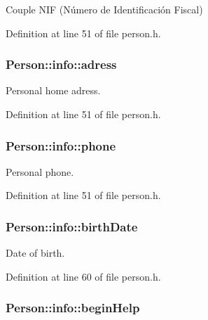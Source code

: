 Couple N\+I\+F (Número de Identificación Fiscal) 



Definition at line 51 of file person.\+h.

\hypertarget{struct_person_1_1info_a350817c964e878c2c59019eb51e9f608}{
\subsubsection[{adress}]{\setlength{\rightskip}{0pt plus 5cm}Person\+::info\+::adress}}\label{struct_person_1_1info_a350817c964e878c2c59019eb51e9f608}


Personal home adress. 



Definition at line 51 of file person.\+h.

\hypertarget{struct_person_1_1info_a07a8d88e73398595a0e0282eaffe9fef}{
\subsubsection[{phone}]{\setlength{\rightskip}{0pt plus 5cm}Person\+::info\+::phone}}\label{struct_person_1_1info_a07a8d88e73398595a0e0282eaffe9fef}


Personal phone. 



Definition at line 51 of file person.\+h.

\hypertarget{struct_person_1_1info_a803a2ee586aaa2503e10447b1435e916}{
\subsubsection[{birth\+Date}]{\setlength{\rightskip}{0pt plus 5cm}Person\+::info\+::birth\+Date}}\label{struct_person_1_1info_a803a2ee586aaa2503e10447b1435e916}


Date of birth. 



Definition at line 60 of file person.\+h.

\hypertarget{struct_person_1_1info_a835c907e641433331e06c62bcde9dfe9}{
\subsubsection[{begin\+Help}]{\setlength{\rightskip}{0pt plus 5cm}Person\+::info\+::begin\+Help}}\label{struct_person_1_1info_a835c907e641433331e06c62bcde9dfe9}



